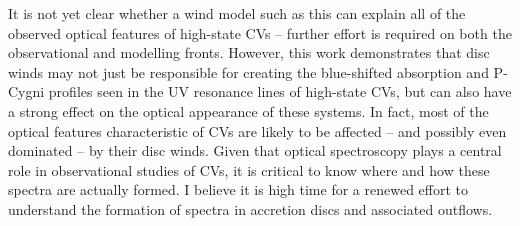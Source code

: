It is not yet clear whether a wind model such as this can
explain all of the observed optical features of high-state CVs --
further effort is required on both the observational
and modelling fronts. However, this work demonstrates that disc winds may
not just be responsible for creating the blue-shifted absorption and
P-Cygni profiles seen in the UV resonance lines of high-state CVs, but
can also have a strong effect on the optical appearance of these
systems. In fact, most of the optical features characteristic of CVs
are likely to be affected -- and possibly even dominated -- by their disc
winds. Given that optical spectroscopy plays a central role in
observational studies of CVs, it is critical to know 
where and how these spectra are actually formed. I believe it is high
time for a renewed effort to understand the formation of spectra in
accretion discs and associated outflows. 


